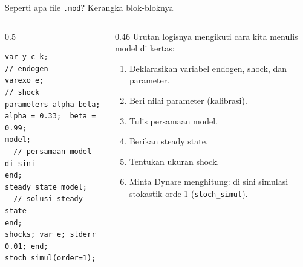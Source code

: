 \documentclass[aspectratio=169,11pt]{beamer}
\begin{document}
\begin{frame}[fragile]{Seperti apa file \texttt{.mod}? Kerangka blok-bloknya}
\begin{columns}[T]
\begin{column}{0.5\textwidth}
\begin{lstlisting}[style=dynare,basicstyle=\ttfamily\scriptsize]
var y c k;              // endogen
varexo e;               // shock
parameters alpha beta;
alpha = 0.33;  beta = 0.99;
model;
  // persamaan model di sini
end;
steady_state_model;
  // solusi steady state
end;
shocks; var e; stderr 0.01; end;
stoch_simul(order=1);
\end{lstlisting}
\end{column}
\begin{column}{0.46\textwidth}
\small
Urutan logisnya mengikuti cara kita menulis model di kertas:
\begin{enumerate}
  \item Deklarasikan variabel endogen, shock, dan parameter.
  \item Beri nilai parameter (kalibrasi).
  \item Tulis persamaan model.
  \item Berikan steady state.
  \item Tentukan ukuran shock.
  \item Minta Dynare menghitung: di sini simulasi stokastik orde 1
        (\texttt{stoch\_simul}).
\end{enumerate}
\end{column}
\end{columns}
\end{frame}
\end{document}
